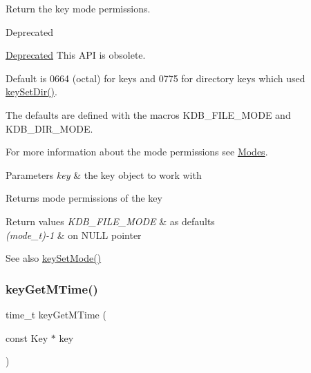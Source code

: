 Return the key mode permissions. 

\begin{DoxyRefDesc}{Deprecated}
\item[\hyperlink{deprecated__deprecated000019}{Deprecated}]This A\+PI is obsolete.\end{DoxyRefDesc}


Default is 0664 (octal) for keys and 0775 for directory keys which used \hyperlink{group__meta_gaae575bd86a628a15ee45baa860522e75}{key\+Set\+Dir()}.

The defaults are defined with the macros K\+D\+B\+\_\+\+F\+I\+L\+E\+\_\+\+M\+O\+DE and K\+D\+B\+\_\+\+D\+I\+R\+\_\+\+M\+O\+DE.

For more information about the mode permissions see \hyperlink{group__meta_mode}{Modes}.


\begin{DoxyParams}{Parameters}
{\em key} & the key object to work with \\
\hline
\end{DoxyParams}
\begin{DoxyReturn}{Returns}
mode permissions of the key 
\end{DoxyReturn}

\begin{DoxyRetVals}{Return values}
{\em K\+D\+B\+\_\+\+F\+I\+L\+E\+\_\+\+M\+O\+DE} & as defaults \\
\hline
{\em (mode\+\_\+t)-\/1} & on N\+U\+LL pointer \\
\hline
\end{DoxyRetVals}
\begin{DoxySeeAlso}{See also}
\hyperlink{group__meta_ga8803037e35b9da1ce492323a88ff6bc3}{key\+Set\+Mode()} 
\end{DoxySeeAlso}
\mbox{\label{group__meta_ga57689eb5691679071463b777ae786ae9}} 
\subsubsection{\texorpdfstring{key\+Get\+M\+Time()}{keyGetMTime()}}
{\footnotesize\ttfamily time\+\_\+t key\+Get\+M\+Time (\begin{DoxyParamCaption}\item[{const Key $\ast$}]{key }\end{DoxyParamCaption})}



